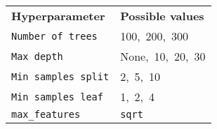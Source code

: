 \documentclass{standalone}
\begin{document}
\begin{center}
    \begin{tabular}{ll}
        \textbf{Hyperparameter} & \textbf{Possible values} \\
        \texttt{Number of trees} & 100,\ 200,\ 300 \\
        \texttt{Max depth} & None,\ 10,\ 20,\ 30 \\
        \texttt{Min samples split} & 2,\ 5,\ 10 \\
        \texttt{Min samples leaf} & 1,\ 2,\ 4 \\
        \texttt{max\_features} & \texttt{sqrt} \\
    \end{tabular}
\end{center}
\end{document}
